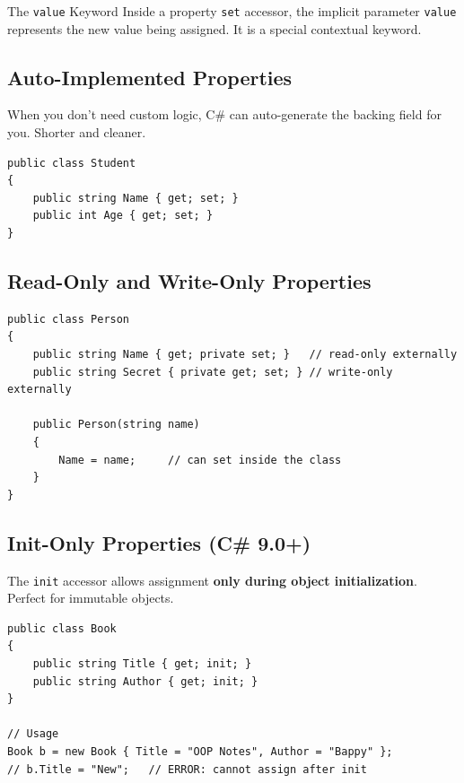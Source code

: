 \documentclass[11pt,a4paper]{article}
\begin{document}
\begin{keyBox}{The \texttt{value} Keyword}
Inside a property \texttt{set} accessor, the implicit parameter \texttt{value} represents the new value being assigned. It is a special contextual keyword.
\end{keyBox}

\subsection{Auto-Implemented Properties}

When you don't need custom logic, C\# can auto-generate the backing field for you. Shorter and cleaner.

\begin{lstlisting}[caption={Auto-properties}]
public class Student
{
    public string Name { get; set; }
    public int Age { get; set; }
}
\end{lstlisting}

\subsection{Read-Only and Write-Only Properties}

\begin{lstlisting}[caption={Read-only / write-only properties}]
public class Person
{
    public string Name { get; private set; }   // read-only externally
    public string Secret { private get; set; } // write-only externally

    public Person(string name)
    {
        Name = name;     // can set inside the class
    }
}
\end{lstlisting}

\subsection{Init-Only Properties (C\# 9.0+)}

The \texttt{init} accessor allows assignment \textbf{only during object initialization}. Perfect for immutable objects.

\begin{lstlisting}[caption={init-only property}]
public class Book
{
    public string Title { get; init; }
    public string Author { get; init; }
}

// Usage
Book b = new Book { Title = "OOP Notes", Author = "Bappy" };
// b.Title = "New";   // ERROR: cannot assign after init
\end{lstlisting}
\end{document}
